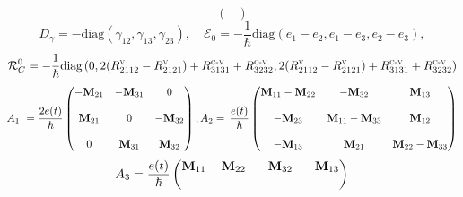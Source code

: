 \documentclass[a4paper]{article}
\begin{document}
\begin{itemize}
$$\begin{pmatrix}
\end{pmatrix}$$
\[D_{\gamma} = -\mathrm{diag}\left(\gamma_{12},  \gamma_{13}, \gamma_{23}\right), \quad  \mathcal{E}_{0} = -\frac{1}{\hbar}\mathrm{diag}\left(e_1-e_2, e_1-e_3, e_2-e_3\right),\]
$$\mathcal{R}^{0}_{C} =- \dfrac{1}{\hbar}  \textrm{diag}\left(0,2(R^{\textsc{v}}_{2112}-R^{\textsc{v}}_{2121})+R^{\textsc{c-v}}_{3131} + R^{\textsc{c-v}}_{3232} , 2(R^{\textsc{v}}_{2112}-R^{\textsc{v}}_{2121})+R^{\textsc{c-v}}_{3131} + R^{\textsc{c-v}}_{3232}\right)$$
\begin{equation*}
A_{1}\  =  \frac{2 e(t)}{\hbar} 
\begin{pmatrix} 
- \textbf{M}_{21}  & - \textbf{M}_{31}& 0 \\ 
\vspace{0.0025cm} & \vspace{0.0025cm} & \vspace{0.0025cm}\\
\textbf{M}_{21}& 0 & - \textbf{M}_{32}\\ 
\vspace{0.0025cm} & \vspace{0.0025cm} & \vspace{0.0025cm}\\
0& \textbf{M}_{31}& \textbf{M}_{32}
\end{pmatrix}, 
A_{2} = \, \frac{e(t)}{\hbar} 
\begin{pmatrix} 
\textbf{M}_{11} - \textbf{M}_{22}  & - \textbf{M}_{32}& \textbf{M}_{13} \\ 
\vspace{0.0025cm} & \vspace{0.0025cm} & \vspace{0.0025cm}\\
-\textbf{M}_{23}& \textbf{M}_{11} - \textbf{M}_{33} &  \textbf{M}_{12}\\ 
\vspace{0.0025cm} & \vspace{0.0025cm} & \vspace{0.0025cm}\\
 - \textbf{M}_{13}& \textbf{M}_{21}& \textbf{M}_{22} - \textbf{M}_{33}
\end{pmatrix}
\end{equation*}
\begin{equation*}
A_{3}  =  \frac{e(t)}{\hbar} 
\begin{pmatrix} 
\textbf{M}_{11} - \textbf{M}_{22}  & - \textbf{M}_{32}& - \textbf{M}_{13} \\ 
\vspace{0.0025cm} & \vspace{0.0025cm} & \vspace{0.0025cm}\\

\end{pmatrix}
\end{equation*}
\end{itemize}
\end{document}
